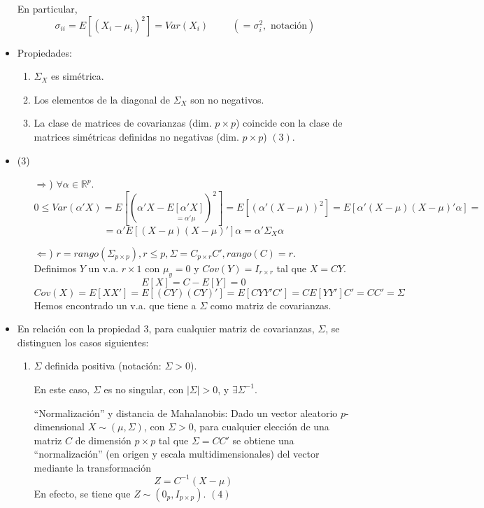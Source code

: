 \documentclass[11pt,a4paper]{article}
\begin{document}
\begin{itemize}
En particular,
$$\sigma_{ii} = E[(X_{i} - \mu_{i})^{2}] = Var(X_{i}) \hspace{1cm} (= \sigma_{i}^{2}, \text{ notación})$$

\item Propiedades:
\begin{enumerate}
\item $\Sigma_{X}$ es simétrica.

\item Los elementos de la diagonal de $\Sigma_{X}$ son no negativos.

\item La clase de matrices de covarianzas (dim. $p \times p$) coincide con la clase de matrices simétricas definidas no negativas (dim. $p \times p$) $(3)$.
\end{enumerate}

\item (3) \begin{itemize}
\item[$\Rightarrow$)] $\forall \alpha \in \mathbb{R}^{p}$.
$$0 \leq Var(\alpha'X) = E[(\alpha'X - \underset{= \alpha'\mu}{E[\alpha'X]})^{2}] = E[(\alpha'(X - \mu))^{2}] = E[\alpha'(X - \mu)(X - \mu)'\alpha] =$$
$$= \alpha'E[(X - \mu)(X - \mu)']\alpha = \alpha'\Sigma_{X}\alpha$$

\item[$\Leftarrow$)] $r = rango(\Sigma_{p \times p}), r \leq p, \Sigma = C_{p \times r}C', rango(C) = r$. \\
Definimos $Y$ un v.a. $r \times 1$ con $\mu_{y} = 0$ y $Cov(Y) = I_{r \times r}$ tal que $X = CY$.
$$E[X] = C - E[Y] = 0$$
$$Cov(X) = E[XX'] = E[(CY)(CY)'] = E[CYY'C'] = CE[YY']C' = CC' = \Sigma$$
Hemos encontrado un v.a. que tiene a $\Sigma$ como matriz de covarianzas.
\end{itemize}

\item En relación con la propiedad 3, para cualquier matriz de covarianzas, $\Sigma$, se distinguen los casos siguientes:
\begin{enumerate}[label=(\Alph*)]
\item $\Sigma$ definida positiva (notación: $\Sigma > 0$).

En este caso, $\Sigma$ es no singular, con $|\Sigma| > 0$, y $\exists \Sigma^{-1}$.

``Normalización'' y distancia de Mahalanobis: Dado un vector aleatorio $p$-dimensional $X \sim (\mu, \Sigma)$, con $\Sigma > 0$, para cualquier elección de una matriz $C$ de dimensión $p \times p$ tal que $\Sigma = CC'$ se obtiene una ``normalización'' (en origen y escala multidimensionales) del vector mediante la transformación
$$Z = C^{-1}(X - \mu)$$
En efecto, se tiene que $Z \sim (0_{p}, I_{p \times p})$. \hspace{1cm} $(4)$


\end{enumerate}
\end{itemize}
\end{document}
